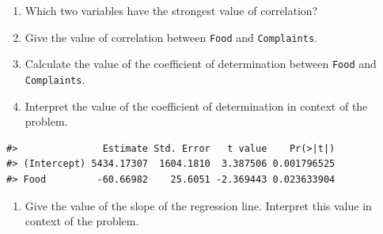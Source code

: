 \documentclass[
]{report}
\newenvironment{Shaded}{\begin{snugshade}}{\end{snugshade}}
\newcommand{\AttributeTok}[1]{\textcolor[rgb]{0.77,0.63,0.00}{#1}}
\newcommand{\CommentTok}[1]{\textcolor[rgb]{0.56,0.35,0.01}{\textit{#1}}}
\newcommand{\FunctionTok}[1]{\textcolor[rgb]{0.00,0.00,0.00}{#1}}
\newcommand{\NormalTok}[1]{#1}
\newcommand{\OtherTok}[1]{\textcolor[rgb]{0.56,0.35,0.01}{#1}}
\newcommand{\SpecialCharTok}[1]{\textcolor[rgb]{0.00,0.00,0.00}{#1}}
\providecommand{\tightlist}{%
  \setlength{\itemsep}{0pt}\setlength{\parskip}{0pt}}
\begin{document}
\begin{enumerate}
\def\labelenumi{\arabic{enumi}.}
\item
  Which two variables have the strongest value of correlation?
  \vspace{0.3in}
\item
  Give the value of correlation between \texttt{Food} and \texttt{Complaints}.
  \vspace{0.2in}
\item
  Calculate the value of the coefficient of determination between \texttt{Food} and \texttt{Complaints}.
  \vspace{0.4in}
\item
  Interpret the value of the coefficient of determination in context of the problem.
  \vspace{0.6in}
\end{enumerate}

\begin{Shaded}
\end{Shaded}

\begin{verbatim}
#>               Estimate Std. Error   t value    Pr(>|t|)
#> (Intercept) 5434.17307  1604.1810  3.387506 0.001796525
#> Food         -60.66982    25.6051 -2.369443 0.023633904
\end{verbatim}

\begin{enumerate}
\def\labelenumi{\arabic{enumi}.}
\setcounter{enumi}{4}
\tightlist
\item
  Give the value of the slope of the regression line. Interpret this value in context of the problem.
  \vspace{0.6in}
\end{enumerate}
\end{document}
